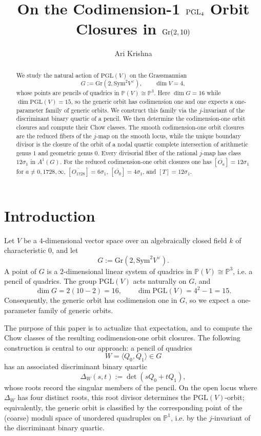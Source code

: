 \documentclass[11pt]{article}
\title{On the Codimension-1 \texorpdfstring{$\PGL_4$}{PGL4} Orbit Closures in \texorpdfstring{$\G(2,10)$}{Gr(2,10)}}
\author{Ari Krishna}
\date{}
\newcommand{\G}{\mathrm{Gr}}
\newcommand{\Pj}{\mathbb P}
\newcommand{\Sym}{\mathrm{Sym}}
\newcommand{\PGL}{\mathrm{PGL}}
\begin{document}
\maketitle

\begin{abstract}
We study the natural action of $\PGL(V)$ on the Grassmannian
\[
G:=\G(2,\Sym^2 V^\vee), \qquad \dim V=4,
\]
whose points are pencils of quadrics in $\Pj(V)\cong \Pj^3$. Here $\dim G=16$ while $\dim \PGL(V)=15$, so the generic orbit has codimension one and one expects a one-parameter family of generic orbits. We construct this family via the $j$-invariant of the discriminant binary quartic of a pencil. We then determine the codimension-one orbit closures and compute their Chow classes.
The smooth codimension-one orbit closures are the reduced fibers of the $j$-map on the smooth
locus, while the unique boundary divisor is the closure of the orbit of a nodal quartic complete
intersection of arithmetic genus $1$ and geometric genus $0$. Every divisorial fiber of the rational $j$-map has class
$12\sigma_1$ in $A^1(G)$. For the reduced codimension-one orbit closures one has
$[\overline{O_a}]=12\sigma_1$ for $a\neq 0,1728,\infty$,
$[\overline{O_{1728}}]=6\sigma_1$, $[\overline{O_0}]=4\sigma_1$, and $[T]=12\sigma_1$.
\end{abstract}

\tableofcontents

\section{Introduction}

Let $V$ be a $4$-dimensional vector space over an algebraically closed field $k$ of characteristic $0$, and let
\[
G:=\G(2,\Sym^2 V^\vee).
\]
A point of $G$ is a $2$-dimensional linear system of quadrics in $\Pj(V)\cong \Pj^3$, i.e. a pencil of quadrics. The group $\PGL(V)$ acts naturally on $G$, and
\[
\dim G = 2(10-2)=16, \qquad \dim \PGL(V)=4^2-1=15.
\]
Consequently, the generic orbit has codimension one in $G$, so we expect a one-parameter family of generic orbits.

The purpose of this paper is to actualize that expectation, and to compute the Chow classes of the resulting codimension-one orbit closures. The following construction is central to our approach: a pencil of quadrics
\[
W=\langle Q_0,Q_1\rangle \in G
\]
has an associated discriminant binary quartic
\[
\Delta_W(s,t):=\det(sQ_0+tQ_1),
\]
whose roots record the singular members of the pencil. On the open locus where $\Delta_W$ has four distinct roots, this root divisor determines the $\PGL(V)$-orbit; equivalently, the generic orbit is classified by the corresponding point of the (coarse) moduli space of unordered quadruples on $\Pj^1$, i.e. by the $j$-invariant of the discriminant binary quartic.
\end{document}
